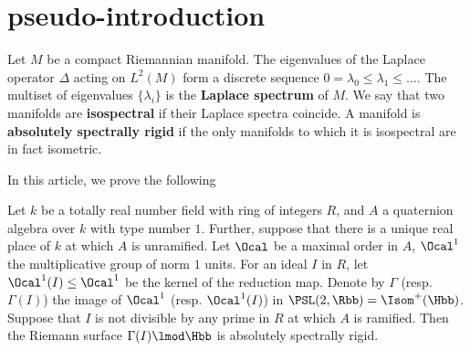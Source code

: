 \documentclass{amsart}
\begin{document}
	
	\section{pseudo-introduction}
	
	Let $M$ be a compact Riemannian manifold. The eigenvalues of the Laplace operator $\Delta$ acting on $L^{2}(M)$ form a discrete sequence $0 =\lambda_{0}\leq \lambda_{1 }\leq \ldots $. The multiset of eigenvalues $\{\lambda_{i}\}$ is the \textbf{Laplace spectrum} of $M$. We say that two manifolds are \textbf{isospectral} if their Laplace spectra coincide. A manifold is \textbf{absolutely spectrally rigid} if the only manifolds to which it is isospectral are in fact isometric.
	
	In this article, we prove the following
	\begin{thm}
		Let $k$ be a totally real number field with ring of integers $R$, and $A$ a quaternion algebra over $k$ with type number $1$. Further, suppose that there is a unique real place of $k$ at which $A$ is unramified. Let $\Ocal$ be a maximal order in $A$, $\Ocal^{1}$ the multiplicative group of norm $1$ units. For an ideal $I$ in $R$, let $\Ocal^{1}(I) \leq \Ocal^{1}$ be the kernel of the reduction map. Denote by $\Gamma$ (resp. $\Gamma(I)$) the image of $\Ocal^{1}$ (resp. $\Ocal^{1}(I)$) in $\PSL(2,\Rbb)  = \Isom^{+}( \Hbb)$. Suppose that $I$ is not divisible by any prime in $R$ at which $A$ is ramified. Then the Riemann surface $\Gamma(I) \lmod \Hbb$ is absolutely spectrally rigid.
	\end{thm}
	
	\begin{comment}
		[TODO] identify the length spectrum for arithmetic hyperbolic surfaces coming
		from maximal orders in quaternion algebras
	\end{comment}
	
\end{document}
